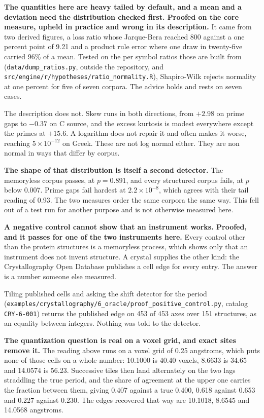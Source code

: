 \textbf{The quantities here are heavy tailed by default, and a mean and a deviation need the distribution checked first. Proofed on the core measure, upheld in practice and wrong in its description.} It came from two derived figures, a loss ratio whose Jarque-Bera reached 800 against a one percent point of 9.21 and a product rule error where one draw in twenty-five carried 96\% of a mean. Tested on the per symbol ratios those are built from (\texttt{data/\allowbreak{}dump\_\allowbreak{}ratios.\allowbreak{}py}, outside the repository, and \texttt{src/\allowbreak{}engine/\allowbreak{}r/\allowbreak{}hypotheses/\allowbreak{}ratio\_\allowbreak{}normality.\allowbreak{}R}), Shapiro-Wilk rejects normality at one percent for five of seven corpora. The advice holds and rests on seven cases.

The description does not. Skew runs in both directions, from \(+2.98\) on prime gaps to \(-0.37\) on C source, and the excess kurtosis is modest everywhere except the primes at \(+15.6\). A logarithm does not repair it and often makes it worse, reaching \(5 \times 10^{-12}\) on Greek. These are not log normal either. They are non normal in ways that differ by corpus.

\textbf{The shape of that distribution is itself a second detector.} The memoryless corpus passes, at \(p = 0.891\), and every structured corpus fails, at \(p\) below 0.007. Prime gaps fail hardest at \(2.2 \times 10^{-8}\), which agrees with their tail reading of 0.93. The two measures order the same corpora the same way. This fell out of a test run for another purpose and is not otherwise measured here.

\textbf{A negative control cannot show that an instrument works. Proofed, and it passes for one of the two instruments here.} Every control other than the protein structures is a memoryless process, which shows only that an instrument does not invent structure. A crystal supplies the other kind: the Crystallography Open Database publishes a cell edge for every entry. The answer is a number someone else measured.

Tiling published cells and asking the shift detector for the period (\texttt{examples/\allowbreak{}crystallography/\allowbreak{}6\_\allowbreak{}oracle/\allowbreak{}proof\_\allowbreak{}positive\_\allowbreak{}control.\allowbreak{}py}, catalog \texttt{CRY-6-001}) returns the published edge on 453 of 453 axes over 151 structures, as an equality between integers. Nothing was told to the detector.

\textbf{The quantization question is real on a voxel grid, and exact sites remove it.} The reading above runs on a voxel grid of 0.25 angstroms, which puts none of those cells on a whole number: 10.1000 is 40.40 voxels, 8.6633 is 34.65 and 14.0574 is 56.23. Successive tiles then land alternately on the two lags straddling the true period, and the share of agreement at the upper one carries the fraction between them, giving 0.407 against a true 0.400, 0.618 against 0.653 and 0.227 against 0.230. The edges recovered that way are 10.1018, 8.6545 and 14.0568 angstroms.

